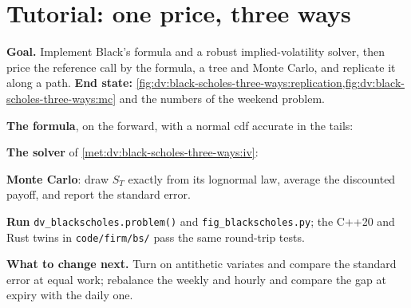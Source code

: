 \section{Tutorial: one price, three ways}\label{tut:dv:black-scholes-three-ways:tut}

\begin{tutorial}
\textbf{Goal.} Implement Black's formula and a robust implied-volatility solver,
then price the reference call by the formula, a tree and Monte Carlo, and replicate
it along a path. \textbf{End state:}
\cref{fig:dv:black-scholes-three-ways:replication,fig:dv:black-scholes-three-ways:mc}
and the numbers of the weekend problem.
\begin{tutsteps}
\item \textbf{The formula}, on the forward, with a normal cdf accurate in the tails:
\label{lst:dv:black-scholes-three-ways:black}
\item \textbf{The solver} of \cref{met:dv:black-scholes-three-ways:iv}:
\label{lst:dv:black-scholes-three-ways:iv}
\item \textbf{Monte Carlo}: draw $S_T$ exactly from its lognormal law, average the
discounted payoff, and report the standard error.
\label{lst:dv:black-scholes-three-ways:mc}
\item \textbf{Run} \texttt{dv\_blackscholes.problem()} and
\texttt{fig\_blackscholes.py}; the C++20 and Rust twins in
\texttt{code/firm/bs/} pass the same round-trip tests.
\end{tutsteps}
\textbf{What to change next.} Turn on antithetic variates and compare the standard
error at equal work; rebalance the  weekly and hourly and
compare the gap at expiry with the daily one.
\end{tutorial}

